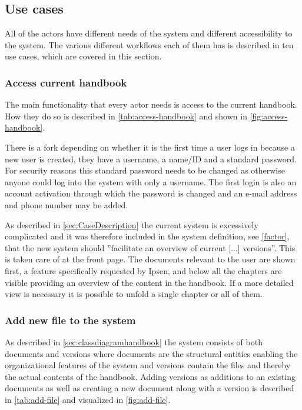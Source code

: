 \subsection{Use cases} \label{sec:usecases}
All of the actors have different needs of the system and different accessibility to the system. The various different workflows each of them has is described in ten use cases, which are covered in this section.
\subsubsection{Access current handbook}



The main functionality that every actor needs is access to the current handbook. How they do so is described in \cref{tab:access-handbook} and shown in \cref{fig:access-handbook}.




There is a fork depending on whether it is the first time a user logs in because a new user is created, they have a username, a name/ID and a standard password.
For security reasons this standard password needs to be changed as otherwise anyone could log into the system with only a username.
The first login is also an account activation through which the password is changed and an e-mail address and phone number may be added.

As described in \cref{sec:CaseDescription} the current system is excessively complicated and it was therefore included in the system definition, see \cref{factor}, that the new system should ''facilitate an overview of current [...] versions''.
This is taken care of at the front page.
The documents relevant to the user are shown first, a feature specifically requested by Ipsen, and below all the chapters are visible providing an overview of the content in the handbook.
If a more detailed view is necessary it is possible to unfold a single chapter or all of them.


\subsubsection{Add new file to the system}
As described in \cref{sec:classdiagramhandbook} the system consists of both documents and versions where documents are the structural entities enabling the organizational features of the system and versions contain the files and thereby the actual contents of the handbook.
Adding versions as additions to an existing documents as well as creating a new document along with a version is described in \cref{tab:add-file} and visualized in \cref{fig:add-file}.

